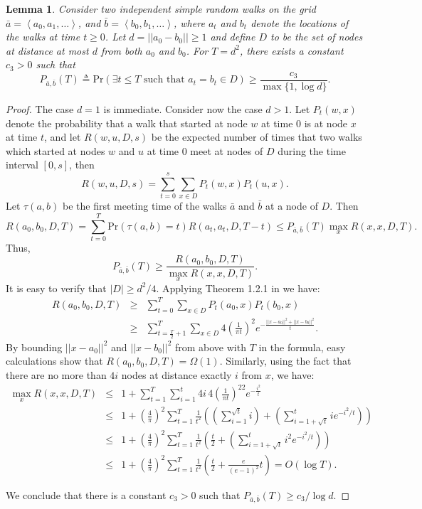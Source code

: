 \documentclass[11pt]{article}
\newcommand{\bigO}[1]{O\left(#1\right)}
\newcommand{\bigOm}[1]{\Omega\left(#1\right)}
\newcommand{\card}[1]{\left|#1\right|}
\newcommand{\dist}[1]{||#1||}
\newcommand{\prob}[1]{\mathrm{Pr}\left({#1}\right)}
\newcommand{\lis}[1]{\left\langle #1 \right\rangle}
\newtheorem{lemm}{Lemma}
\begin{document}
\begin{lemm}
\label{lemm:MeetingProbability}
Consider two independent simple random walks on the grid
$\bar{a} = \lis{a_0, a_1, \ldots}$, and $\bar{b} = \lis{b_0, b_1, \ldots}$,
where $a_t$ and $b_t$ denote the locations of the walks at time $t \geq 0$.
Let $d=\dist{a_0 -b_0}\geq 1$ and define $D$ to be the set of nodes at
distance at most $d$ from both $a_0$ and $b_0$.
For $T=d^2$, there exists a constant $c_3 > 0$ such that
\[
	P_{\bar{a},\bar{b}}(T) \triangleq \prob{\exists t\leq T \text{ such that } a_t=b_t \in D} \geq \frac{c_3}{\max\{1, \log d\}}.
\]
\end{lemm}
\begin{proof}
The case $d=1$ is immediate. Consider now the case $d>1$.  Let $P_t
(w, x)$ denote the probability that a walk that started at node $w$ at
time 0 is at node $x$ at time $t$, and let $R(w,u,D,s)$ be
the expected number of times that two walks which started at nodes $w$
and $u$ at time 0 meet at nodes of $D$ during the time
interval $[0,s]$, then
\[
R(w,u,D,s)=\sum_{t=0}^s \sum_{x \in D} P_t (w, x)P_t (u,x).
\]
Let $\tau (a,b)$ be the first meeting time of the walks $\bar{a}$ and
$\bar{b}$ at a node of $D$. Then
\[
R(a_0,b_0,D,T) = 
\sum_{t=0}^T 
\prob{\tau (a,b)=t}R(a_t,a_t,D,T-t) \leq 
P_{\bar{a},\bar{b}}(T) \max_x R(x,x,D,T).
\]
Thus, 
\[
P_{\bar{a},\bar{b}}(T) \geq 
\frac{R(a_0,b_0,D,T)}{\max_x R(x,x,D,T)}.
\]
It is easy to verify that $\card{D} \geq d^2 / 4$.
Applying Theorem 1.2.1 in \cite{Lawler91} we have:
\begin{eqnarray*}
R(a_0,b_0,D,T)
	&\geq &\sum_{t=0}^{T} \sum_{x\in D} P_t (a_0, x)P_t (b_0,x)\\
	&\geq &\sum_{t=\frac{T}{2}+1}^{T} \sum_{x\in D} 4\left(\frac{1}{\pi t}\right)^2e^{-\frac{\dist{x-a_0}^2 + \dist{x-b_0}^2}{t}}.
\end{eqnarray*}
By bounding $\dist{x-a_0}^2$ and $\dist{x-b_0}^2$ from above with $T$
in the formula, easy calculations show that $R(a_0,b_0,D,T) =
\bigOm{1}$.  Similarly, using the fact that there are no more than
$4i$ nodes at distance exactly $i$ from $x$, we have:
\begin{eqnarray*}
\max_x R(x,x,D,T) &\leq& 1 + \sum_{t=1}^T \sum_{i = 1}^{t} 4i\, 4\left(\frac{1}{\pi t}\right)^22 e^{-\frac{i^2}{t}} \\
&\leq & 1 + \left(\frac{4}{\pi}\right)^2 \sum_{t=1}^T \frac{1}{t^2} \left(\left(\sum_{i=1}^{\sqrt{t}} i\right) + \left(\sum_{i=1+\sqrt{t}}^{t} i e^{-i^2/t}\right)\right)\\
&\leq & 1 + \left(\frac{4}{\pi}\right)^2 \sum_{t=1}^T \frac{1}{t^2} \left(\frac{t}{2} + \left(\sum_{i=1+\sqrt{t}}^{t} i^2 e^{-i^2/t}\right)\right)\\
&\leq & 1 + \left(\frac{4}{\pi}\right)^2 \sum_{t=1}^T \frac{1}{t^2} \left(\frac{t}{2} + \frac{e}{(e-1)^2} t \right) = \bigO{\log T}.
\end{eqnarray*}

We conclude that there is a constant $c_3>0$ such that
$P_{\bar{a},\bar{b}}(T) \geq c_3/\log d$.\qedhere
\end{proof}
\end{document}
